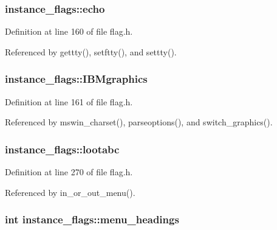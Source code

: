 \hypertarget{structinstance__flags_a4a064908e2a505018c11319cc53d7fe1}{
\subsubsection[{echo}]{ instance\+\_\+flags\+::echo}}\label{structinstance__flags_a4a064908e2a505018c11319cc53d7fe1}


Definition at line 160 of file flag.\+h.



Referenced by gettty(), setftty(), and settty().

\hypertarget{structinstance__flags_a50993380c2db8f82946efa771d779154}{
\subsubsection[{I\+B\+Mgraphics}]{ instance\+\_\+flags\+::\+I\+B\+Mgraphics}}\label{structinstance__flags_a50993380c2db8f82946efa771d779154}


Definition at line 161 of file flag.\+h.



Referenced by mswin\+\_\+charset(), parseoptions(), and switch\+\_\+graphics().

\hypertarget{structinstance__flags_a4e7bf81f6c7abf2059b03f6cb3287690}{
\subsubsection[{lootabc}]{ instance\+\_\+flags\+::lootabc}}\label{structinstance__flags_a4e7bf81f6c7abf2059b03f6cb3287690}


Definition at line 270 of file flag.\+h.



Referenced by in\+\_\+or\+\_\+out\+\_\+menu().

\hypertarget{structinstance__flags_a1640b6b04fb84038cf353a42d268b9be}{
\subsubsection[{menu\+\_\+headings}]{\setlength{\rightskip}{0pt plus 5cm}int instance\+\_\+flags\+::menu\+\_\+headings}}\label{structinstance__flags_a1640b6b04fb84038cf353a42d268b9be}


